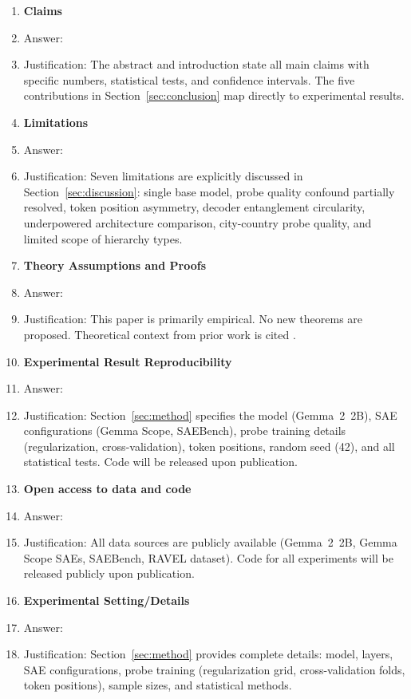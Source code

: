 \documentclass{article}
\begin{document}
\begin{enumerate}

\item {\bf Claims}
    \item[] Answer: \answerYes{}
    \item[] Justification: The abstract and introduction state all main claims with specific numbers, statistical tests, and confidence intervals. The five contributions in Section~\ref{sec:conclusion} map directly to experimental results.

\item {\bf Limitations}
    \item[] Answer: \answerYes{}
    \item[] Justification: Seven limitations are explicitly discussed in Section~\ref{sec:discussion}: single base model, probe quality confound partially resolved, token position asymmetry, decoder entanglement circularity, underpowered architecture comparison, city-country probe quality, and limited scope of hierarchy types.

\item {\bf Theory Assumptions and Proofs}
    \item[] Answer: \answerNA{}
    \item[] Justification: This paper is primarily empirical. No new theorems are proposed. Theoretical context from prior work is cited \citep{chanin2024absorption, cui2025limits, wright2025absorption}.

\item {\bf Experimental Result Reproducibility}
    \item[] Answer: \answerYes{}
    \item[] Justification: Section~\ref{sec:method} specifies the model (Gemma~2~2B), SAE configurations (Gemma Scope, SAEBench), probe training details (regularization, cross-validation), token positions, random seed (42), and all statistical tests. Code will be released upon publication.

\item {\bf Open access to data and code}
    \item[] Answer: \answerYes{}
    \item[] Justification: All data sources are publicly available (Gemma~2~2B, Gemma Scope SAEs, SAEBench, RAVEL dataset). Code for all experiments will be released publicly upon publication.

\item {\bf Experimental Setting/Details}
    \item[] Answer: \answerYes{}
    \item[] Justification: Section~\ref{sec:method} provides complete details: model, layers, SAE configurations, probe training (regularization grid, cross-validation folds, token positions), sample sizes, and statistical methods.


\end{enumerate}
\end{document}
